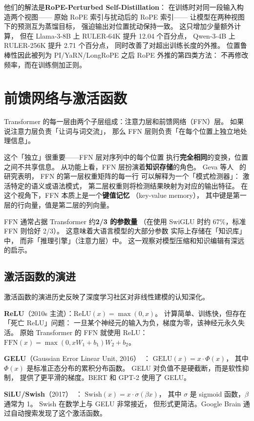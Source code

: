 他们的解法是\textbf{RoPE-Perturbed Self-Distillation}：
在训练时对同一段输入构造两个视图——
原始 RoPE 索引与扰动后的 RoPE 索引——
让模型在两种视图下的预测互为蒸馏目标，
强迫输出对位置扰动保持一致。
这只增加少量额外计算，
但在 Llama-3-8B 上 RULER-64K 提升 12.04 个百分点，
Qwen-3-4B 上 RULER-256K 提升 2.71 个百分点，
同时改善了对超出训练长度的外推。
位置鲁棒性因此被列为 PI/YaRN/LongRoPE 之后
RoPE 外推的第四类方法：
不再修改频率，而在训练侧加正则。

\section{前馈网络与激活函数}

Transformer 的每一层由两个子层组成：注意力层和前馈网络（FFN）层。
如果说注意力层负责「让词与词交流」，
那么 FFN 层则负责「在每个位置上独立地处理信息」。

这个「独立」很重要——FFN 层对序列中的每个位置
执行\textbf{完全相同}的变换，位置之间不共享信息。
从功能上看，FFN 层扮演着\textbf{知识存储}的角色。
Geva 等人~\cite{geva2021transformer} 的研究表明，
FFN 的第一层权重矩阵的每一行
可以解释为一个「模式检测器」：
激活特定的语义或语法模式，
第二层权重则将检测结果映射为对应的输出特征。
在这个视角下，FFN 本质上是一个\textbf{键值记忆}
（key-value memory），
其中键是第一层的行向量，值是第二层的列向量。

FFN 通常占据 Transformer 约\textbf{2/3 的参数量}
（在使用 SwiGLU 时约 67\%，标准 FFN 则恰好 2/3）。
这意味着大语言模型的大部分参数
实际上存储在「知识库」中，
而非「推理引擎」（注意力层）中。
这一观察对模型压缩和知识编辑有深远的启示。

\subsection{激活函数的演进}

激活函数的演进历史反映了深度学习社区对非线性建模的认知深化。

\textbf{ReLU}（2010s 主流）：$\mathrm{ReLU}(x) = \max(0, x)$。
计算简单、训练快，但存在「死亡 ReLU」问题：
一旦某个神经元的输入为负，梯度为零，该神经元永久失活。
原始 Transformer 的 FFN 就使用 ReLU：
$\mathrm{FFN}(x) = \max(0, xW_1 + b_1) W_2 + b_2$。

\textbf{GELU}（Gaussian Error Linear Unit, 2016）~\cite{hendrycks2016gelu}：
$\mathrm{GELU}(x) = x \cdot \Phi(x)$，
其中 $\Phi(x)$ 是标准正态分布的累积分布函数。
GELU 对负值不是硬截断，而是软性抑制，
提供了更平滑的梯度。BERT 和 GPT-2 使用了 GELU。

\textbf{SiLU/Swish}（2017）~\cite{ramachandran2017swish}：
$\mathrm{Swish}(x) = x \cdot \sigma(\beta x)$，
其中 $\sigma$ 是 sigmoid 函数，$\beta$ 通常为 1。
Swish 在数学上与 GELU 非常接近，
但形式更简洁。Google Brain 通过自动搜索发现了这个激活函数。

